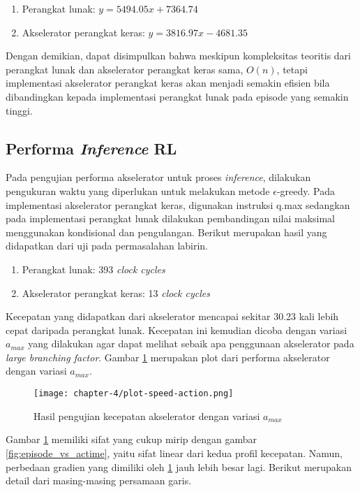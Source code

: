 \begin{enumerate}
	\item Perangkat lunak: $y = 5494.05x + 7364.74$
	\item Akselerator perangkat keras: $y = 3816.97x - 4681.35$
\end{enumerate}

Dengan demikian, dapat disimpulkan bahwa meskipun kompleksitas teoritis dari perangkat lunak dan akselerator perangkat keras sama, $O(n)$, tetapi implementasi akselerator perangkat keras akan menjadi semakin efisien bila dibandingkan kepada implementasi perangkat lunak pada episode yang semakin tinggi.

\subsection{Performa \textit{Inference} \acl{RL}}
\label{subsec:performance-inference}

Pada pengujian performa akselerator untuk proses \textit{inference}, dilakukan pengukuran waktu yang diperlukan untuk melakukan metode $\epsilon$-greedy. Pada implementasi akselerator perangkat keras, digunakan instruksi q.max sedangkan pada implementasi perangkat lunak dilakukan pembandingan nilai maksimal menggunakan kondisional dan pengulangan. Berikut merupakan hasil yang didapatkan dari uji pada permasalahan labirin.

\begin{enumerate}
	\item Perangkat lunak: 393 \textit{clock cycles}
	\item Akselerator perangkat keras: 13 \textit{clock cycles}
\end{enumerate}

Kecepatan yang didapatkan dari akselerator mencapai sekitar 30.23 kali lebih cepat daripada perangkat lunak. Kecepatan ini kemudian dicoba dengan variasi $a_{max}$ yang dilakukan agar dapat melihat sebaik apa penggunaan akselerator pada \textit{large branching factor}. Gambar \ref{fig:speed-action} merupakan plot dari performa akselerator dengan variasi $a_{max}$.

\begin{figure}[htbp]
	\centering
	\texttt{[image: chapter-4/plot-speed-action.png]}
	\caption{Hasil pengujian kecepatan akselerator dengan variasi $a_{max}$}
	\label{fig:speed-action}
\end{figure}

Gambar \ref{fig:speed-action} memiliki sifat yang cukup mirip dengan gambar \ref{fig:episode_vs_actime}, yaitu sifat linear dari kedua profil kecepatan. Namun, perbedaan gradien yang dimiliki oleh \ref{fig:speed-action} jauh lebih besar lagi. Berikut merupakan detail dari masing-masing persamaan garis.

